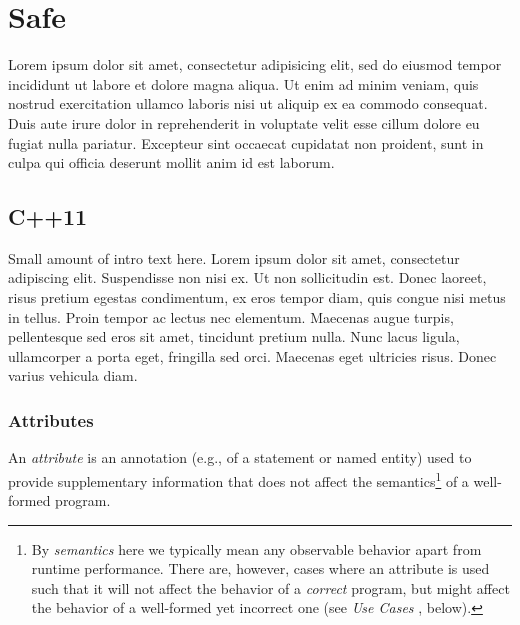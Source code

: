 \documentclass[twoside,10pt,letterpaper,usenames]{newstyle-PearsonGeneric-7-38}
\author{}
\date{}
\begin{document}




% 
% 
% 

\cleardoublepage %

\chapter{Safe}\label{SafeChap}
 
    
Lorem ipsum dolor sit amet, consectetur adipisicing elit, sed do eiusmod tempor incididunt ut labore et dolore magna aliqua. Ut enim ad minim veniam, quis nostrud exercitation ullamco laboris nisi ut aliquip ex ea commodo consequat. Duis aute irure dolor in reprehenderit in voluptate velit esse cillum dolore eu fugiat nulla pariatur. Excepteur sint occaecat cupidatat non proident, sunt in culpa qui officia deserunt mollit anim id est laborum.


\section[C++11]{C++11}\label{c++11}

Small amount of intro text here. Lorem ipsum dolor sit amet, consectetur
adipiscing elit. Suspendisse non nisi ex. Ut non sollicitudin est. Donec
laoreet, risus pretium egestas condimentum, ex eros tempor diam, quis
congue nisi metus in tellus. Proin tempor ac lectus nec elementum.
Maecenas augue turpis, pellentesque sed eros sit amet, tincidunt pretium
nulla. Nunc lacus ligula, ullamcorper a porta eget, fringilla sed orci.
Maecenas eget ultricies risus. Donec varius vehicula diam.

\subsection[Attributes]{Attributes}\label{attributes}

An \emph{attribute} is an annotation (e.g., of a statement or named
{entity}) used to provide supplementary information that does not affect
the semantics{\cprotect\footnote{By \emph{semantics} here we typically
  mean any observable behavior apart from runtime performance. There
  are, however, cases where an attribute is used such that it will not
  affect the behavior of a \emph{correct} program, but might affect the
  behavior of a well-formed yet incorrect one (see \emph{Use Cases} ,
  below).}} of a well-formed program.
\end{document}
